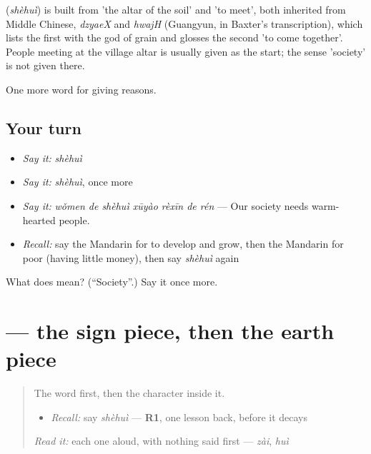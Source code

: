 \begin{cousinweb}
\textbf{} (\emph{shèhuì}) is built from  'the altar of the soil' and  'to meet', both inherited from Middle Chinese, \emph{dzyaeX} and \emph{hwajH} (Guangyun, in Baxter's transcription), which lists the first with the god of grain and glosses the second 'to come together'. People meeting at the village altar is usually given as the start; the sense 'society' is not given there.
\end{cousinweb}

\begin{grammarlens}[title={What you've built}]
One more word for giving reasons.
\end{grammarlens}

\subsection*{Your turn}
\begin{itemize}
\raggedright
  \item \emph{Say it:} \emph{shèhuì}
  \item \emph{Say it:} \emph{shèhuì}, once more
  \item \emph{Say it:} \emph{wǒmen de shèhuì xūyào rèxīn de rén} — Our society needs warm-hearted people.
  \item \emph{Recall:} say the Mandarin for to develop and grow, then the Mandarin for poor (having little money), then say \emph{shèhuì} again
\end{itemize}

\begin{tcolorbox}[breakable,colback=teal!4,colframe=teal!35!black,title={Before you move on}]
What does  mean? (\textquotedblleft{}Society\textquotedblright{}.) Say it once more.
\end{tcolorbox}
\section[\texorpdfstring{\zh{社} (shè)}{社 (shè)}]{ — the sign piece, then the earth piece}

\label{lesson:ZH-W375-she-society}



\begin{quote}
The word first, then the character inside it.

\begin{itemize}
\raggedright
  \item \emph{Recall:} say \emph{shèhuì} — \textbf{R1}, one lesson back, before it decays
\end{itemize}

\begin{quote}
 
\end{quote}

\emph{Read it:} each one aloud, with nothing said first — \emph{zài}, \emph{huì}
\end{quote}

